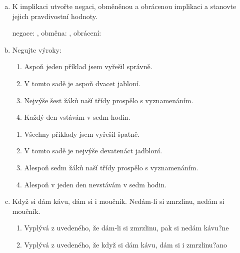 \begin{example}[ŘMÚ 174/28.5]
  \begin{enumerate}[a.]
    \item K implikaci  utvořte negaci, obměněnou a obrácenou implikaci a stanovte jejich pravdivostní hodnoty.

    {\rm negace: , obměna: , obrácení: }
    \item Negujte výroky:
    \begin{enumerate}[1.]
      \item Aspoň jeden příklad jsem vyřešil správně.
      \item V tomto sadě je aspoň dvacet jabloní.
      \item Nejvýše šest žáků naší třídy prospělo s vyznamenáním.
      \item Každý den vstávám v sedm hodin.
    \end{enumerate}
    \vspace{3em}
    {\rm
      \begin{enumerate}[1.]
        \item Všechny příklady jsem vyřešil špatně.
        \item V tomto sadě je nejvýše devatenáct jadbloní.
        \item Alespoň sedm žáků naší třídy prospělo s vyznamenáním.
        \item Alespoň v jeden den nevstávám v sedm hodin.
      \end{enumerate}
    }
    \item Když si dám kávu, dám si i moučník. Nedám-li si zmrzlinu, nedám si moučník.
    \begin{enumerate}[1.]
      \item Vyplývá z uvedeného, že dám-li si zmrzlinu, pak si nedám kávu?\hfill {\rm ne}
      \item Vyplývá z uvedeného, že když si dám kávu, dám si i zmrzlinu?\hfill {\rm ano}
    \end{enumerate}
  \end{enumerate}
\end{example}

